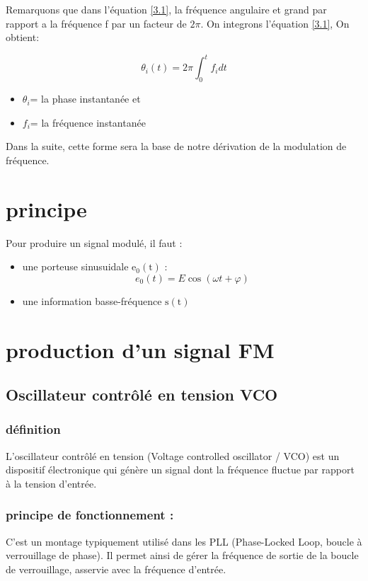 \documentclass[12pt,a4paper,hidelinks,oneside]{book}
\begin{document}
Remarquons que dans l'équation \ref{3.1}, la fréquence angulaire et grand par rapport a la fréquence f par un facteur de $2\pi$. On integrons l'équation \ref{3.1}, On obtient:

\begin{equation}
\theta_{i}(t)=2 \pi \int_{0}^{t} f_{i} d t \label{3.2}
\end{equation}

\begin{itemize}
	\item $\theta_{i}$= la phase instantanée et
	\item $f_{i}$= la fréquence instantanée
\end{itemize}

Dans la suite, cette forme sera la base de notre dérivation de la modulation de fréquence.
\section{principe}
Pour produire un signal modulé, il faut :
\begin{itemize}
	\item une porteuse sinusuidale $\mathrm{e_0}(\mathrm{t})$ :
	\begin{equation}
	e_{0}(t)=E \cos (\omega t+\varphi) 
	\end{equation}
	\item une information basse-fréquence $\mathrm{s}(\mathrm{t})$
\end{itemize}

\section{production d'un signal FM}
\subsection{Oscillateur contrôlé en tension VCO}
\subsubsection{définition}
L'oscillateur contrôlé en tension (Voltage controlled oscillator / VCO) est un dispositif électronique qui génère un signal dont la fréquence fluctue par rapport à la tension d'entrée.
\subsubsection{principe de fonctionnement :}
C'est un montage typiquement utilisé dans les PLL (Phase-Locked Loop, boucle à verrouillage de phase). Il permet ainsi de gérer la fréquence de sortie de la boucle de verrouillage, asservie avec la fréquence d'entrée.
\end{document}
